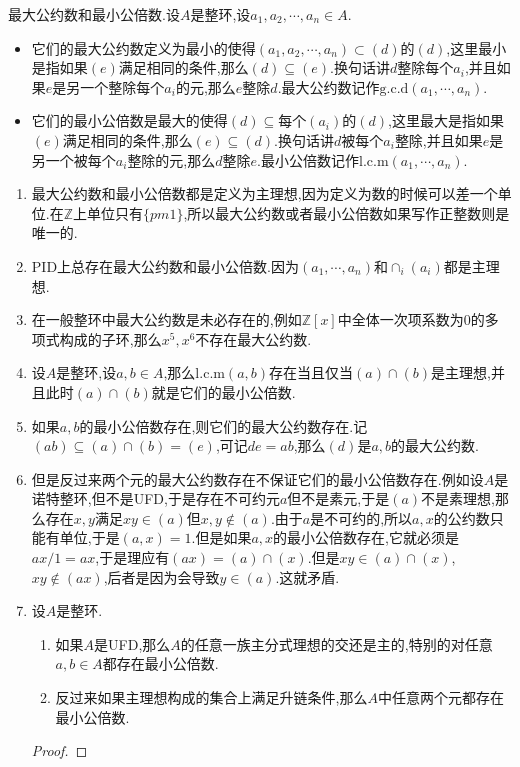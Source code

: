 最大公约数和最小公倍数.设$A$是整环,设$a_1,a_2,\cdots,a_n\in A$.
\begin{itemize}
	\item 它们的最大公约数定义为最小的使得$(a_1,a_2,\cdots,a_n)\subset(d)$的$(d)$,这里最小是指如果$(e)$满足相同的条件,那么$(d)\subseteq(e)$.换句话讲$d$整除每个$a_i$,并且如果$e$是另一个整除每个$a_i$的元,那么$e$整除$d$.最大公约数记作$\mathrm{g.c.d}(a_1,\cdots,a_n)$.
	\item 它们的最小公倍数是最大的使得$(d)\subseteq$每个$(a_i)$的$(d)$,这里最大是指如果$(e)$满足相同的条件,那么$(e)\subseteq(d)$.换句话讲$d$被每个$a_i$整除,并且如果$e$是另一个被每个$a_i$整除的元,那么$d$整除$e$.最小公倍数记作$\mathrm{l.c.m}(a_1,\cdots,a_n)$.
\end{itemize}
\begin{enumerate}
	\item 最大公约数和最小公倍数都是定义为主理想,因为定义为数的时候可以差一个单位.在$\mathbb{Z}$上单位只有$\{pm1\}$,所以最大公约数或者最小公倍数如果写作正整数则是唯一的.
	\item PID上总存在最大公约数和最小公倍数.因为$(a_1,\cdots,a_n)$和$\cap_i(a_i)$都是主理想.
	\item 在一般整环中最大公约数是未必存在的,例如$\mathbb{Z}[x]$中全体一次项系数为0的多项式构成的子环,那么$x^5,x^6$不存在最大公约数.
	\item 设$A$是整环,设$a,b\in A$,那么$\mathrm{l.c.m}(a,b)$存在当且仅当$(a)\cap(b)$是主理想,并且此时$(a)\cap(b)$就是它们的最小公倍数.
	\item 如果$a,b$的最小公倍数存在,则它们的最大公约数存在.记$(ab)\subseteq(a)\cap(b)=(e)$,可记$de=ab$,那么$(d)$是$a,b$的最大公约数.
	\item 但是反过来两个元的最大公约数存在不保证它们的最小公倍数存在.例如设$A$是诺特整环,但不是UFD,于是存在不可约元$a$但不是素元,于是$(a)$不是素理想,那么存在$x,y$满足$xy\in(a)$但$x,y\not\in(a)$.由于$a$是不可约的,所以$a,x$的公约数只能有单位,于是$(a,x)=1$.但是如果$a,x$的最小公倍数存在,它就必须是$ax/1=ax$,于是理应有$(ax)=(a)\cap(x)$.但是$xy\in(a)\cap(x)$,$xy\not\in(ax)$,后者是因为会导致$y\in(a)$.这就矛盾.
	\item 设$A$是整环.
	\begin{enumerate}
		\item 如果$A$是UFD,那么$A$的任意一族主分式理想的交还是主的,特别的对任意$a,b\in A$都存在最小公倍数.
		\item 反过来如果主理想构成的集合上满足升链条件,那么$A$中任意两个元都存在最小公倍数.
	\end{enumerate}
    \begin{proof}
    	

\end{proof}
\end{enumerate}

